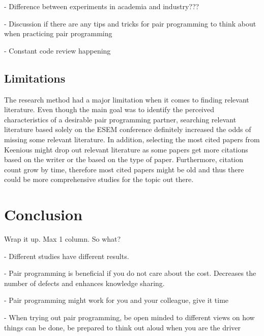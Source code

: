 \documentclass[conference]{IEEEtran}
\begin{document}
- Difference between experiments in academia and industry???

- Discussion if there are any tips and tricks for pair programming to think about when practicing pair programming

- Constant code review happening

\subsection{Limitations}

The research method had a major limitation when it comes to finding relevant literature. Even though the main goal was to identify the perceived characteristics of a desirable pair programming partner, searching relevant literature based solely on the ESEM conference definitely increased the odds of missing some relevant literature. In addition, selecting the most cited papers from Keenious might drop out relevant literature as some papers get more citations based on the writer or the based on the type of paper. Furthermore, citation count grow by time, therefore most cited papers might be old and thus there could be more comprehensive studies for the topic out there.

\section{Conclusion}

Wrap it up. Max 1 column. So what? 

- Different studies have different results. 

- Pair programming is beneficial if you do not care about the cost. Decreases the number of defects and enhances knowledge sharing. 

- Pair programming might work for you and your colleague, give it time

- When trying out pair programming, be open minded to different views on how things can be done, be prepared to think out aloud when you are the driver






\end{document}
